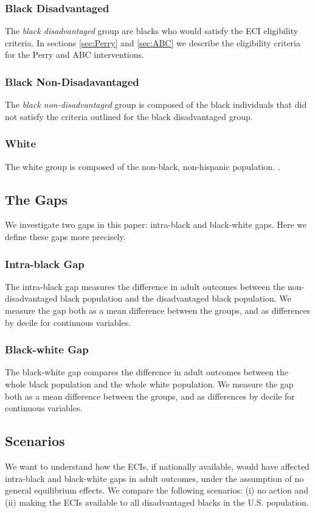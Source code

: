 \subsubsection*{Black Disadvantaged}
The \emph{black disadvantaged} group are blacks who would satisfy the ECI eligibility criteria. In sections \ref{sec:Perry} and \ref{sec:ABC} we describe the eligibility criteria for the Perry and ABC interventions. 

\subsubsection*{Black Non-Disadavantaged}
The \emph{black non-disadvantaged} group is composed of the black individuals that did not satisfy the criteria outlined for the black disadvantaged group.

\subsubsection*{White}
The white group is composed of the non-black, non-hispanic population. .

\subsection{The Gaps}
We investigate two gaps in this paper: intra-black and black-white gaps. Here we define these gaps more precisely.

\subsubsection*{Intra-black Gap}
The intra-black gap measures the difference in adult outcomes between the non-disadvantaged black population and the disadvantaged black population. We measure the gap both as a mean difference between the groups, and as differences by decile for continuous variables.

\subsubsection*{Black-white Gap}
The black-white gap compares the difference in adult outcomes between the whole black population and the whole white population.  We measure the gap both as a mean difference between the groups, and as differences by decile for continuous variables.

\subsection{Scenarios}
We want to understand how the ECIs, if nationally available, would have affected intra-black and black-white gaps in adult outcomes, under the assumption of no general equilibrium effects. We compare the following scenarios: (i) no action and (ii) making the ECIs available to all disadvantaged blacks in the U.S. population. 


